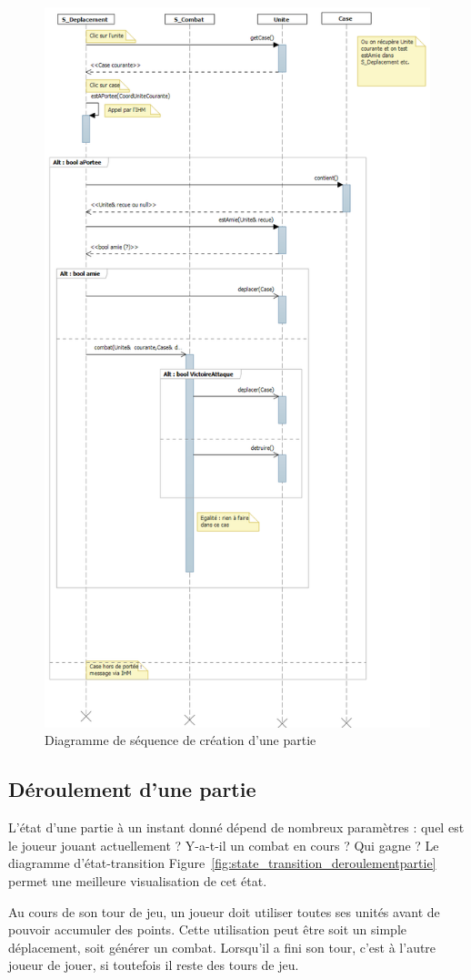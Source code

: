 \documentclass[a4paper]{article}%
\begin{document}
\begin{figure}[H]
   \centering
   \includegraphics[height=\textwidth,angle =270]{./images/sequence/DiagSeqCreationPartie.png}
                \caption{Diagramme de séquence de création d'une partie}
                \label{fig:sequence_creationpartie}
\end{figure}

\newpage

\subsection{Déroulement d'une partie}

L'état d'une partie à un instant donné dépend de nombreux paramètres : quel est le joueur jouant actuellement ? Y-a-t-il un combat en cours ? Qui gagne ? Le diagramme d'état-transition Figure~\ref{fig:state_transition_deroulementpartie} permet une meilleure visualisation de cet état.

\medskip

	Au cours de son tour de jeu, un joueur doit utiliser toutes ses unités avant de pouvoir accumuler des points. Cette utilisation peut être soit un simple déplacement, soit générer un combat. Lorsqu'il a fini son tour, c'est à l'autre joueur de jouer, si toutefois il reste des tours de jeu.
	
\end{document}
